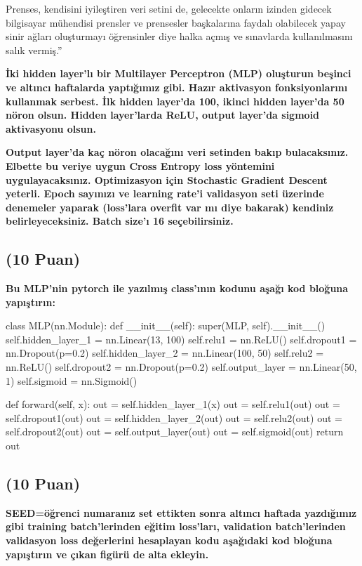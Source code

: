 \documentclass[11pt]{article}
\begin{document}
Prenses, kendisini iyileştiren veri setini de, gelecekte onların izinden gidecek bilgisayar mühendisi prensler ve prensesler başkalarına faydalı olabilecek yapay sinir ağları oluşturmayı öğrensinler diye halka açmış ve sınavlarda kullanılmasını salık vermiş.''

\textbf{İki hidden layer'lı bir Multilayer Perceptron (MLP) oluşturun beşinci ve altıncı haftalarda yaptığımız gibi. Hazır aktivasyon fonksiyonlarını kullanmak serbest. İlk hidden layer'da 100, ikinci hidden layer'da 50 nöron olsun. Hidden layer'larda ReLU, output layer'da sigmoid aktivasyonu olsun.}

\textbf{Output layer'da kaç nöron olacağını veri setinden bakıp bulacaksınız. Elbette bu veriye uygun Cross Entropy loss yöntemini uygulayacaksınız. Optimizasyon için Stochastic Gradient Descent yeterli. Epoch sayınızı ve learning rate'i validasyon seti üzerinde denemeler yaparak (loss'lara overfit var mı diye bakarak) kendiniz belirleyeceksiniz. Batch size'ı 16 seçebilirsiniz.}

\subsection{(10 Puan)} \textbf{Bu MLP'nin pytorch ile yazılmış class'ının kodunu aşağı kod bloğuna yapıştırın:}

\begin{python}
class MLP(nn.Module):
    def __init__(self):
        super(MLP, self).__init__()
        self.hidden_layer_1 = nn.Linear(13, 100) 
        self.relu1 = nn.ReLU()
        self.dropout1 = nn.Dropout(p=0.2)
        self.hidden_layer_2 = nn.Linear(100, 50)
        self.relu2 = nn.ReLU()
        self.dropout2 = nn.Dropout(p=0.2)
        self.output_layer = nn.Linear(50, 1) 
        self.sigmoid = nn.Sigmoid()

    def forward(self, x):
        out = self.hidden_layer_1(x)
        out = self.relu1(out)
        out = self.dropout1(out)
        out = self.hidden_layer_2(out)
        out = self.relu2(out)
        out = self.dropout2(out)
        out = self.output_layer(out)
        out = self.sigmoid(out)
        return out
\end{python}

\subsection{(10 Puan)} \textbf{SEED=öğrenci numaranız set ettikten sonra altıncı haftada yazdığımız gibi training batch'lerinden eğitim loss'ları, validation batch'lerinden validasyon loss değerlerini hesaplayan kodu aşağıdaki kod bloğuna yapıştırın ve çıkan figürü de alta ekleyin.}
\end{document}
